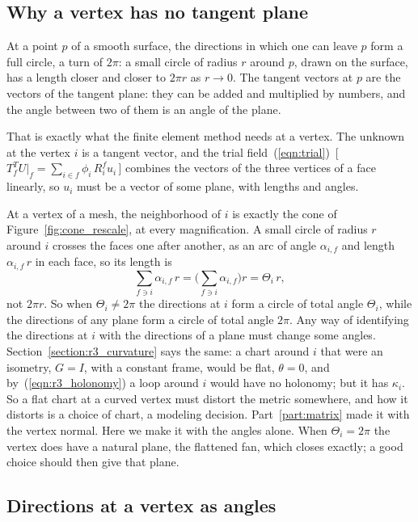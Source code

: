 \subsection{Why a vertex has no tangent plane}

At a point $p$ of a smooth surface, the directions in which one can leave $p$ form a full circle, a turn of $2\pi$: a small circle of radius $r$ around $p$, drawn on the surface, has a length closer and closer to $2\pi r$ as $r \to 0$. The tangent vectors at $p$ are the vectors of the tangent plane: they can be added and multiplied by numbers, and the angle between two of them is an angle of the plane.

That is exactly what the finite element method needs at a vertex. The unknown at the vertex $i$ is a tangent vector, and the trial field~(\ref{eqn:trial})~[\,$T_f^TU|_f = \sum_{i \in f} \phi_i\, R_i^f u_i$\,] combines the vectors of the three vertices of a face linearly, so $u_i$ must be a vector of some plane, with lengths and angles.

At a vertex of a mesh, the neighborhood of $i$ is exactly the cone of Figure~\ref{fig:cone_rescale}, at every magnification. A small circle of radius $r$ around $i$ crosses the faces one after another, as an arc of angle $\alpha_{i,f}$ and length $\alpha_{i,f}\, r$ in each face, so its length is
\begin{equation*}
\sum_{f\ni i}\alpha_{i,f}\, r = \Big(\sum_{f\ni i}\alpha_{i,f}\Big) r = \Theta_i\, r ,
\end{equation*}
not $2\pi r$. So when $\Theta_i \neq 2\pi$ the directions at $i$ form a circle of total angle $\Theta_i$, while the directions of any plane form a circle of total angle $2\pi$. Any way of identifying the directions at $i$ with the directions of a plane must change some angles. Section~\ref{section:r3_curvature} says the same: a chart around $i$ that were an isometry, $G = I$, with a constant frame, would be flat, $\theta = 0$, and by~(\ref{eqn:r3_holonomy}) a loop around $i$ would have no holonomy; but it has $\kappa_i$. So a flat chart at a curved vertex must distort the metric somewhere, and how it distorts is a choice of chart, a modeling decision. Part~\ref{part:matrix} made it with the vertex normal. Here we make it with the angles alone. When $\Theta_i = 2\pi$ the vertex does have a natural plane, the flattened fan, which closes exactly; a good choice should then give that plane.

\subsection{Directions at a vertex as angles}


